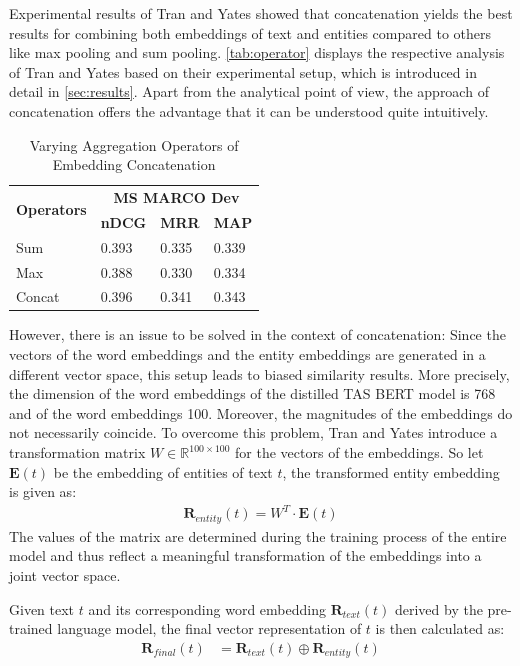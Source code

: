 Experimental results of Tran and Yates showed that concatenation yields the best results for combining both embeddings of text and entities compared to others like max pooling and sum pooling. \autoref{tab:operator} displays the respective analysis of Tran and Yates based on their experimental setup, which is introduced in detail in \autoref{sec:results}. Apart from the analytical point of view, the approach of concatenation offers the advantage that it can be understood quite intuitively.

\begin{table}[!htb]
    \centering
    \begin{tabular}{llll}
    \hline
    \multirow{2}{*}{\textbf{Operators}} & \multicolumn{3}{c}{\textbf{MS MARCO Dev}}   \\
                                      & \textbf{nDCG} & \textbf{MRR} & \textbf{MAP} \\
    \hline
    Sum & 0.393 & 0.335 & 0.339 \\
    Max & 0.388 & 0.330 & 0.334 \\
    Concat & 0.396 & 0.341 & 0.343 \\
    \hline
    \end{tabular}
    \caption{Varying Aggregation Operators of Embedding Concatenation}
    \label{tab:operator}
\end{table}

However, there is an issue to be solved in the context of concatenation: Since the vectors of the word embeddings and the entity embeddings are generated in a different vector space, this setup leads to biased similarity results. More precisely, the dimension of the word embeddings of the distilled TAS BERT model is 768 and of the word embeddings 100. Moreover, the magnitudes of the embeddings do not necessarily coincide. To overcome this problem, Tran and Yates introduce a transformation matrix $W \in \mathbb{R}^{100 \times 100}$ for the vectors of the embeddings. So let $\mathbf{E}(t)$ be the embedding of entities of text $t$, the transformed entity embedding is given as:
\begin{align}
    \mathbf{R}_{entity}(t) = W^T \cdot \mathbf{E}(t)
\end{align}
The values of the matrix are determined during the training process of the entire model and thus reflect a meaningful transformation of the embeddings into a joint vector space. 

Given text $t$ and its corresponding word embedding $\mathbf{R}_{text}(t)$ derived by the pre-trained language model, the final vector representation of $t$ is then calculated as:
\begin{align}
    \mathbf{R}_{final}(t) &= \mathbf{R}_{text}(t) \oplus \mathbf{R}_{entity}(t)
\end{align}

